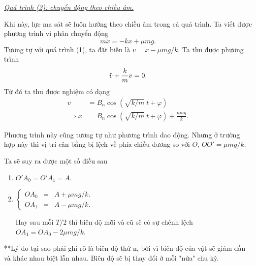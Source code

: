 \underline{\textit{Quá trình (2): chuyển động theo chiều âm.}}
\vspace{2mm}

Khi này, lực ma sát sẽ luôn hướng theo chiều âm trong cả quá trình. Ta viết được phương trình vi phân chuyển động
\begin{equation}
    m \ddot{x} =  - kx + \mu m g.
    \label{eq:1.6}
\end{equation}
Tương tự với quá trình (1), ta đặt biến là $v = x - \mu mg/k$. Ta thu được phương trình
\begin{equation*}
    \ddot{v} + {\frac{k}{m} \displaystyle} v = 0.
\end{equation*}
Từ đó ta thu được nghiệm có dạng
\begin{equation}
    \begin{split}
        v &= B_n \cos{\left(\sqrt{k/m} \ t + \varphi \right)} \\
        \Rightarrow x &=  B_n \cos{\left(\sqrt{k/m} \ t + \varphi \right)} + {\displaystyle \frac{\mu m g}{k}}.
    \end{split}
    \label{eq:1.7}
\end{equation}

Phương trình này cũng tương tự như phương trình dao động. Nhưng ở trường hợp này thì vị trí cân bằng bị lệch về phía chiều dương so với $O$, $OO' = \mu mg/k$. 

\begin{figure}[!htb]
    \centering
    
    \caption{}
    \label{fig:1.4}
\end{figure}

Ta sẽ suy ra được một số điều sau
\begin{enumerate}
    \item \(O'A_0 = O'A_1 = A\).
    \item 
    \(
    \left\{
        \begin{array}{ccc}
        OA_0 &=& A + \mu mg/k. \\ 
        OA_1 &=& A - \mu mg/k.
        \end{array}
    \right.
    \) 

    Hay sau mỗi \(T/2\) thì biên độ mỡi và cũ sẽ có sự chênh lệch
    \(OA_1 = OA_0 - 2 \mu mg/k\).
\end{enumerate}

**Lý do tại sao phải ghi rõ là biên độ thứ n, bởi vì biên độ của vật sẽ giảm dần và khác nhau biệt lẫn nhau. Biên độ sẽ bị thay đổi ở mỗi "nửa" chu kỳ. 
\vspace{2mm}

